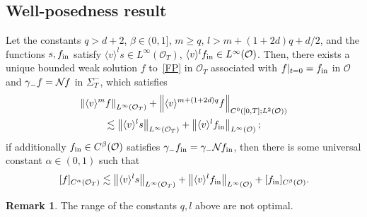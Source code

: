 \documentclass[10pt]{amsart}
\theoremstyle{definition}\newtheorem{defi}[theo]{Definition}\newtheorem{rema}[theo]{Remark}\newtheorem{exam}[theo]{Example}\newtheorem{exem}[theo]{Example}\newtheorem{nota}[theo]{Notation}
\newcommand*\fin {f_{\rm in}}
\newcommand*\NN {{\mathcal{N}\hspace{-.3mm}}}
\newcommand*\OO {\mathcal{O}}
\newcommand{\lv}{\langle v\rangle}
\begin{document}
\subsection{Well-posedness result}

\begin{prop}\label{globalr}
Let the constants $q>d+2$, $\beta\in(0,1]$, $m\ge q$, $l>m+(1+2d)q+d/2$, and the functions $s,\fin$ satisfy $\lv^ls\in L^\infty(\OO_T)$, $\lv^l\fin\in L^\infty(\OO)$. Then, there exists a unique bounded weak solution $f$ to~\eqref{FP} in $\OO_T$ associated with $f|_{t=0}=\fin$ in $\OO$ and $\gamma_-f=\NN f$ in $\Sigma_T^-$, which satisfies
\begin{multline}\label{bddgr}
\left\|\lv^mf\right\|_{L^\infty(\OO_T)} +\left\|\lv^{m+(1+2d)q} f\right\|_{C^0\left([0,T];L^2(\OO)\right)}\\
\lesssim \left\|\lv^ls\right\|_{L^\infty(\OO_T)} + \left\|\lv^l\fin\right\|_{L^\infty(\OO)} ;
\end{multline}
if additionally $\fin\in C^\beta(\OO)$ satisfies $\gamma_-\fin=\gamma_-\NN\fin$, then there is some universal constant $\alpha\in(0,1)$ such that
\begin{equation}\label{holdergr}
[f]_{C^\alpha(\OO_T)}
\lesssim \left\|\lv^ls\right\|_{L^\infty(\OO_T)} + \left\|\lv^l\fin\right\|_{L^\infty(\OO)} +[\fin]_{C^\beta(\OO)}.
\end{equation}
\end{prop}

\begin{rema}
The range of the constants $q,l$ above are not optimal.
\end{rema}
\end{document}
